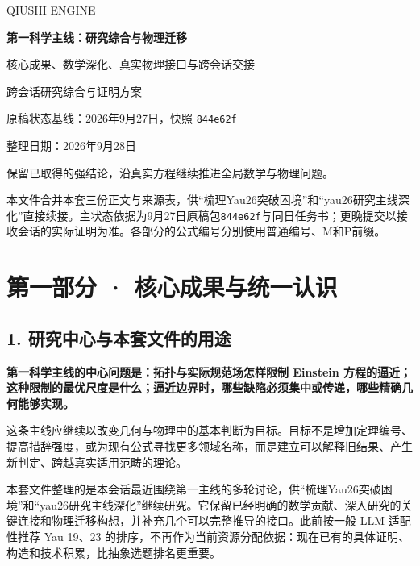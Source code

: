 \documentclass[UTF8,a4paper,11pt,fontset=fandol]{ctexart}
\begin{document}
\begin{titlepage}
\thispagestyle{empty}
\vspace*{2cm}
{\large\sffamily QIUSHI ENGINE\par}
\vspace{1.3cm}
{\Huge\bfseries 第一科学主线：研究综合与物理迁移\par}
\vspace{0.8cm}
{\Large 核心成果、数学深化、真实物理接口与跨会话交接\par}
\vspace{1.2cm}
{\large 跨会话研究综合与证明方案\par}
\vfill
{\normalsize 原稿状态基线：2026年9月27日，快照 \texttt{844e62f}\par}
\vspace{0.35cm}
{\normalsize 整理日期：2026年9月28日\par}
\vspace{1cm}
{\small 保留已取得的强结论，沿真实方程继续推进全局数学与物理问题。\par}
\end{titlepage}
\tableofcontents
\clearpage
本文件合并本套三份正文与来源表，供``梳理Yau26突破困境''和``yau26研究主线深化''直接续接。主状态依据为9月27日原稿包\texttt{844e62f}与同日任务书；更晚提交以接收会话的实际证明为准。各部分的公式编号分别使用普通编号、M和P前缀。

\section{第一部分 ·
核心成果与统一认识}\label{ux7b2cux4e00ux90e8ux5206-ux6838ux5fc3ux6210ux679cux4e0eux7edfux4e00ux8ba4ux8bc6}

\subsection{1.
研究中心与本套文件的用途}\label{ux7814ux7a76ux4e2dux5fc3ux4e0eux672cux5957ux6587ux4ef6ux7684ux7528ux9014}

\textbf{第一科学主线的中心问题是：拓扑与实际规范场怎样限制 Einstein
方程的逼近；这种限制的最优尺度是什么；逼近边界时，哪些缺陷必须集中或传递，哪些精确几何能够实现。}

这条主线应继续以改变几何与物理中的基本判断为目标。目标不是增加定理编号、提高措辞强度，或为现有公式寻找更多领域名称，而是建立可以解释旧结果、产生新判定、跨越真实适用范畴的理论。

本套文件整理的是本会话最近围绕第一主线的多轮讨论，供``梳理Yau26突破困境''和``yau26研究主线深化''继续研究。它保留已经明确的数学贡献、深入研究的关键连接和物理迁移构想，并补充几个可以完整推导的接口。此前按一般
LLM 适配性推荐 Yau 19、23
的排序，不再作为当前资源分配依据：现在已有的具体证明、构造和技术积累，比抽象选题排名更重要。
\end{document}
